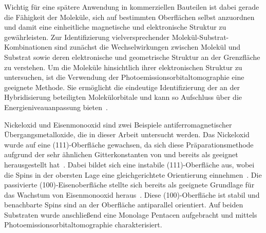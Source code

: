     Wichtig für eine spätere Anwendung in kommerziellen Bauteilen ist dabei gerade die Fähigkeit der Moleküle, sich auf bestimmten Oberflächen selbst anzuordnen und damit eine einheitliche magnetische und elektronische Struktur zu gewährleisten.
    Zur Identifizierung vielversprechender Molekül-Substrat-Kombinationen sind zunächst die Wechselwirkungen zwischen Molekül und Substrat sowie deren elektronische und geometrische Struktur an der Grenzfläche zu verstehen.
    Um die Moleküle hinsichtlich ihrer elektronischen Struktur zu untersuchen, ist die Verwendung der Photoemissionsorbitaltomographie eine geeignete Methode.
    Sie ermöglicht die eindeutige Identifizierung der an der Hybridisierung beteiligten Molekülorbitale und kann so Aufschluss über die Energieniveauanpassung bieten~\cite{MM_2, MM_5}. %

    Nickeloxid und Eisenmonooxid sind zwei Beispiele antiferromagnetischer Übergangsmetalloxide, die in dieser Arbeit untersucht werden.
    Das Nickeloxid wurde auf eine (111)-Oberfläche gewachsen, da sich diese Präparationsmethode aufgrund der sehr ähnlichen Gitterkonstanten von  und  bereits als geeignet herausgestellt hat~\cite{NiO_37}.
    Dabei bildet sich eine instabile (111)-Oberfläche aus, wobei die Spins in der obersten Lage eine gleichgerichtete Orientierung einnehmen~\cite{cappus_hydroxyl_1993}.
    Die passivierte (100)-Eisenoberfläche stellte sich bereits als geeignete Grundlage für das Wachstum von Eisenmonooxid heraus~\cite{FeO_1}.
    Diese (100)-Oberfläche ist stabil und benachbarte Spins sind an der Oberfläche antiparallel orientiert.
    Auf beiden Substraten wurde anschließend eine Monolage Pentacen aufgebracht und mittels Photoemissionsorbitaltomographie charakterisiert.
    

